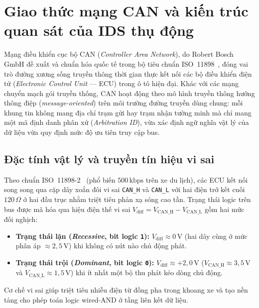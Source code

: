 \documentclass[12pt, a4paper, reqno, oneside]{book}
\DeclareRobustCommand{\code}[1]{\nolinkurl{#1}}
\begin{document}
\section{Giao thức mạng CAN và kiến trúc quan sát của IDS thụ động}
Mạng điều khiển cục bộ CAN (\textit{Controller Area Network}), do Robert Bosch GmbH đề xuất và chuẩn hóa quốc tế trong bộ tiêu chuẩn ISO~11898~\cite{bosch1991can,iso11898_1_2015,iso11898_2_2016}, đóng vai trò đường xương sống truyền thông thời gian thực kết nối các bộ điều khiển điện tử (\textit{Electronic Control Unit} --- ECU) trong ô tô hiện đại. Khác với các mạng chuyển mạch gói truyền thống, CAN hoạt động theo mô hình truyền thông hướng thông điệp (\textit{message-oriented}) trên môi trường đường truyền dùng chung: mỗi khung tin không mang địa chỉ trạm gửi hay trạm nhận tường minh mà chỉ mang một mã định danh phân xử (\textit{Arbitration ID}), vừa xác định ngữ nghĩa vật lý của dữ liệu vừa quy định mức độ ưu tiên truy cập bus.

\subsection{Đặc tính vật lý và truyền tín hiệu vi sai}
Theo chuẩn ISO~11898-2~\cite{iso11898_2_2016} (phổ biến $500\,\text{kbps}$ trên xe du lịch), các ECU kết nối song song qua cặp dây xoắn đôi vi sai \code{CAN_H} và \code{CAN_L} với hai điện trở kết cuối $120\,\Omega$ ở hai đầu trục nhằm triệt tiêu phản xạ sóng cao tần. Trạng thái logic trên bus được mã hóa qua hiệu điện thế vi sai $V_{\text{diff}} = V_{\text{CAN\_H}} - V_{\text{CAN\_L}}$ gồm hai mức đối nghịch:
\begin{itemize}
    \item \textbf{Trạng thái lặn (\textit{Recessive}, bit logic \texttt{1}):} $V_{\text{diff}} \approx 0\,\text{V}$ (hai dây cùng ở mức phân áp $\approx 2{,}5\,\text{V}$) khi không có nút nào chủ động phát.
    \item \textbf{Trạng thái trội (\textit{Dominant}, bit logic \texttt{0}):} $V_{\text{diff}} \approx +2{,}0\,\text{V}$ ($V_{\text{CAN\_H}} \approx 3{,}5\,\text{V}$ và $V_{\text{CAN\_L}} \approx 1{,}5\,\text{V}$) khi ít nhất một bộ thu phát kéo dòng chủ động.
\end{itemize}
Cơ chế vi sai giúp triệt tiêu nhiễu điện từ đồng pha trong khoang xe và tạo nền tảng cho phép toán logic wired-AND ở tầng liên kết dữ liệu.
\end{document}
